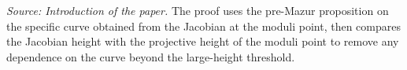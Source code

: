 \begin{theorem}
  \label{thm:bd_fin_rank}
  \textit{Source: Introduction of the paper.}
  The proof uses the pre-Mazur proposition on the specific curve obtained from
  the Jacobian at the moduli point, then compares the Jacobian height with the
  projective height of the moduli point to remove any dependence on the curve
  beyond the large-height threshold.
\end{theorem}


